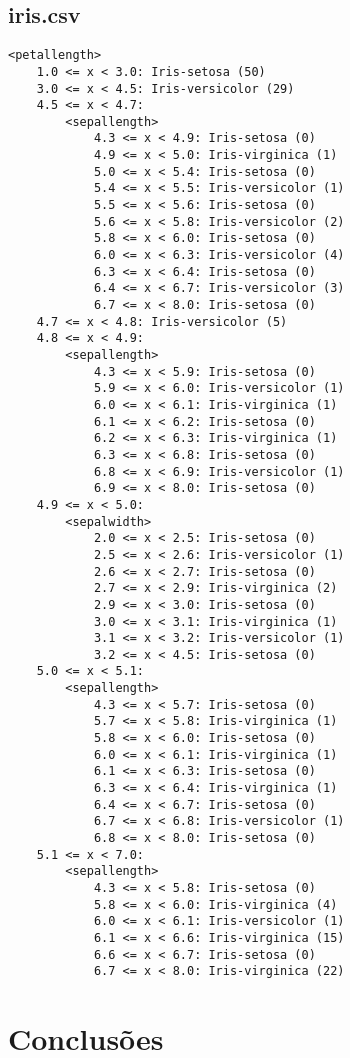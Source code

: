 \documentclass[12pt,a4paper]{article}
\begin{document}
\subsection{iris.csv}
\begin{lstlisting}
<petallength>
	1.0 <= x < 3.0: Iris-setosa (50)
	3.0 <= x < 4.5: Iris-versicolor (29)
	4.5 <= x < 4.7:
		<sepallength>
			4.3 <= x < 4.9: Iris-setosa (0)
			4.9 <= x < 5.0: Iris-virginica (1)
			5.0 <= x < 5.4: Iris-setosa (0)
			5.4 <= x < 5.5: Iris-versicolor (1)
			5.5 <= x < 5.6: Iris-setosa (0)
			5.6 <= x < 5.8: Iris-versicolor (2)
			5.8 <= x < 6.0: Iris-setosa (0)
			6.0 <= x < 6.3: Iris-versicolor (4)
			6.3 <= x < 6.4: Iris-setosa (0)
			6.4 <= x < 6.7: Iris-versicolor (3)
			6.7 <= x < 8.0: Iris-setosa (0)
	4.7 <= x < 4.8: Iris-versicolor (5)
	4.8 <= x < 4.9:
		<sepallength>
			4.3 <= x < 5.9: Iris-setosa (0)
			5.9 <= x < 6.0: Iris-versicolor (1)
			6.0 <= x < 6.1: Iris-virginica (1)
			6.1 <= x < 6.2: Iris-setosa (0)
			6.2 <= x < 6.3: Iris-virginica (1)
			6.3 <= x < 6.8: Iris-setosa (0)
			6.8 <= x < 6.9: Iris-versicolor (1)
			6.9 <= x < 8.0: Iris-setosa (0)
	4.9 <= x < 5.0:
		<sepalwidth>
			2.0 <= x < 2.5: Iris-setosa (0)
			2.5 <= x < 2.6: Iris-versicolor (1)
			2.6 <= x < 2.7: Iris-setosa (0)
			2.7 <= x < 2.9: Iris-virginica (2)
			2.9 <= x < 3.0: Iris-setosa (0)
			3.0 <= x < 3.1: Iris-virginica (1)
			3.1 <= x < 3.2: Iris-versicolor (1)
			3.2 <= x < 4.5: Iris-setosa (0)
	5.0 <= x < 5.1:
		<sepallength>
			4.3 <= x < 5.7: Iris-setosa (0)
			5.7 <= x < 5.8: Iris-virginica (1)
			5.8 <= x < 6.0: Iris-setosa (0)
			6.0 <= x < 6.1: Iris-virginica (1)
			6.1 <= x < 6.3: Iris-setosa (0)
			6.3 <= x < 6.4: Iris-virginica (1)
			6.4 <= x < 6.7: Iris-setosa (0)
			6.7 <= x < 6.8: Iris-versicolor (1)
			6.8 <= x < 8.0: Iris-setosa (0)
	5.1 <= x < 7.0:
		<sepallength>
			4.3 <= x < 5.8: Iris-setosa (0)
			5.8 <= x < 6.0: Iris-virginica (4)
			6.0 <= x < 6.1: Iris-versicolor (1)
			6.1 <= x < 6.6: Iris-virginica (15)
			6.6 <= x < 6.7: Iris-setosa (0)
			6.7 <= x < 8.0: Iris-virginica (22)
\end{lstlisting}

\section{Conclusões}


 
\end{document}
